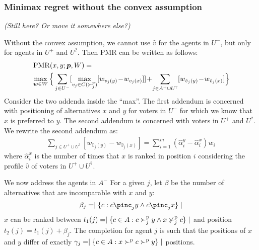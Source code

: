 \subsubsection{Minimax regret without the convex assumption}
{\em (Still here? Or move it somewhere else?) }

Without the convex assumption, we cannot use $\hat{v}$ for the agents in $U^{-}$, but only for agents in $U^{+}$ and $U^{?}$.
Then PMR can be written as follows:
\begin{align*}
 &\operatorname{PMR}(x,y; \bm{p}, W) =\\ 
 &\max_{\bm{w} \in W} \Big \{ \sum_{j \in U^-} [\max_{v_j \in C(\succ_j^p)} [w_{v_j(y)} \!-\! w_{v_j(x)}]] 
  \!+\!	 \sum_{j \in A^+ \cup  U^?} [w_{\hat{v}_j(y)} \!-\! w_{\hat{v}_j(x)}] \Big \} 
 \end{align*}
Consider the two addenda inside the ``max''. 
The first addendum is concerned with positioning of alternatives $x$ and $y$ for voters in $U^{-}$ for which we know that $x$ is preferred to $y$.
The second addendum is concerned with voters in $U^{+}$ and $U^{?}$.
We rewrite the second addendum as:
\begin{align*}
\sum_{j \in U^+ \cup  U^?} [w_{\hat{v}_j(y)} \!-\! w_{\hat{v}_j(x)}] 
= \sum_{i = 1}^{m} (\hat{\alpha}_{i}^{y} - \hat{\alpha}_{i}^{x}) w_{i}
\end{align*}
where $\hat{\alpha}_{i}^{x}$ is the number of times that $x$ is ranked  in position $i$  considering the profile $\hat{v}$ of voters in $U^+ \cup  U^?$.

We now address the agents in $A^{-}$
For a given $j$, let $\beta$ be the number of alternatives that are incomparable with $x$ and $y$:
\[ \beta_{j} = \mid \{ c : c \pinc_{j} y \wedge c \pinc_{j} x \} \mid \]
$x$ can be ranked between $t_{1}(j)=\mid \{ c \in A : c \succ^\text{p}_{j} y \wedge x \nsucc^\text{p}_{j} c \} \mid $ and position $t_{2}(j)=t_{1}(j)+\beta_{j}$.
The completion for agent $j$ is such that the positions of $x$ and $y$ differ of exactly $\gamma_{j} =
\mid \{ c \in A : x \succ^\text{p} c \succ^\text{p} y \} \mid$ positions.


